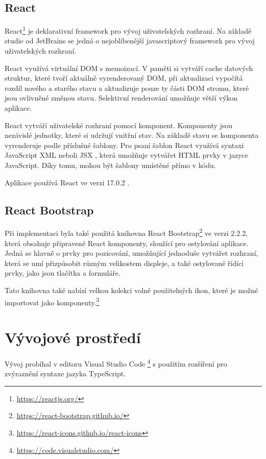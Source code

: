 \subsection{React}

React\footnote{\url{https://reactjs.org/}} je deklarativní framework pro vývoj uživatelských rozhraní. Na základě studie od JetBrains \cite{JBStudie} se jedná o nejoblíbenější javascriptový framework pro vývoj uživatelských rozhraní. 

React využívá virtuální DOM s memoizací. V paměti si vytváří cache datových struktur, které tvoří aktuálně vyrenderovaný DOM, při aktualizaci vypočítá rozdíl nového a starého stavu a aktualizuje pouze ty části DOM stromu, které jsou ovlivněné změnou stavu. Selektivní renderování umožňuje větší výkon aplikace. \cite{ReactReconciliation}

React vytváří uživatelské rozhraní pomocí komponent. Komponenty jsou nezávislé jednotky, které si udržují vnitřní stav.\cite{ReactComponents} Na základě stavu se komponenta vyrenderuje podle příslušné šablony. Pro psaní šablon React využívá syntaxi JavaScript XML neboli JSX \cite{ReactJSX}, která umožňuje vytvářet HTML prvky v jazyce JavaScript. Díky tomu, mohou být šablony umístěné přímo v kódu.

Aplikace používá React ve verzi 17.0.2 \cite{Reactv17}.

\subsection{React Bootstrap}

Při implementaci byla také použitá knihovna React Bootstrap\footnote{\url{https://react-bootstrap.github.io/}} ve verzi 2.2.2, která obsahuje připravené React komponenty, sloužící pro ostylování aplikace. Jedná se hlavně o prvky pro pozicování, umožňující jednoduše vytvářet rozhraní, která se umí přizpůsobit různým velikostem displeje, a také ostylované řídící prvky, jako jsou tlačítka a formuláře.

Tato knihovna také nabízí velkou kolekci volně použitelných ikon, které je možné importovat jako komponenty.\footnote{\url{https://react-icons.github.io/react-icons}}

\section{Vývojové prostředí}

Vývoj probíhal v editoru Visual Studio Code \footnote{\url{https://code.visualstudio.com/}} s použitím rozšíření pro zvýraznění syntaxe jazyka TypeScript.

